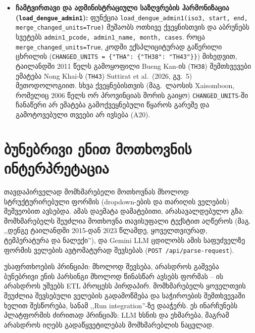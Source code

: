 \documentclass[11pt,a4paper]{article}
\begin{document}
\begin{itemize}[leftmargin=1.4em]
\begin{itemize}
      \item \textbf{შრი-ლანკა (\texttt{LKA}):} 1996--2004, $960$ სტრიქონი, 9 პროვინცია (\texttt{LK1}--\texttt{LK9}, Survey Department of Sri Lanka; 9-ვე ზუსტი ავტომატური დამთხვევაა; Eastern \texttt{LK5}-ს 2000 წელს მონაცემი არ აქვს).
      \item \textbf{სალვადორი (\texttt{SLV}):} 2000--2009, $1\,587$ სტრიქონი, 14 დეპარტამენტი (\texttt{SV01}--\texttt{SV14}, წყარო \texttt{www.gadm.org}; 8 ზუსტი და 6 ესპანური დიაკრიტიკული დამთხვევა HDX-ის \texttt{adm1\_ref\_name}-ით; San Salvador \texttt{SV10} იწყება 2003-01-დან).
    \end{itemize}
  \item \textbf{ჩამტვირთავი და ადმინისტრაციული საზღვრების ჰარმონიზაცია (\texttt{load\_dengue\_admin1}):}
    ფუნქცია \texttt{load\_dengue\_admin1(iso3, start, end, merge\_changed\_units=True)} მუშაობს ოთხივე
    ქვეყნისთვის და აბრუნებს სვეტებს \texttt{admin1\_pcode, admin1\_name, month, cases}. როცა
    \texttt{merge\_changed\_units=True}, კოდში ექსპლიციტურად გაწერილი ცხრილის
    (\texttt{CHANGED\_UNITS = \{"THA": \{"TH38": "TH43"\}\}}) მიხედვით, ტაილანდში 2011 წელს გამოყოფილი
    Bueng Kan-ის (\texttt{TH38}) შემთხვევები ემატება Nong Khai-ს (\texttt{TH43}) Suttirat et al.\ (2026, გვ.~5)
    მეთოდოლოგიით. სხვა ქვეყნებისთვის (მაგ.\ ლაოსის Xaisomboon, რომელიც 2006 წელს ორ პროვინციას შორის გაიყო)
    \texttt{CHANGED\_UNITS}-ში ჩანაწერი არ ემატება გამოქვეყნებული წყაროს გარეშე და გამოტოვებული თვეები არ ივსება (A20).
\end{itemize}

\section{ბუნებრივი ენით მოთხოვნის ინტერპრეტაცია}
\label{sec:nl-parsing}

თავდაპირველად მომხმარებელი მოთხოვნას მხოლოდ სტრუქტურირებული ფორმის
(dropdown-ების და თარიღის ველების) მეშვეობით ავსებდა. ამას დაემატა
დამატებითი, არასავალდებულო გზა: მომხმარებელს შეუძლია მოთხოვნა
თავისუფალი ტექსტით აღწეროს (მაგ. ,,დენგე ტაილანდში 2015-დან 2023
წლამდე, ყოველთვიურად, ტემპერატურა და ნალექი''), და Gemini LLM ცდილობს
ამის საფუძველზე ფორმის ველების ავტომატურად შევსებას
(\texttt{POST /api/parse-request}).

\begin{infobox}{უსაფრთხოების პრინციპი: მხოლოდ შევსება, არასდროს გაშვება}
ბუნებრივი ენის პარსინგი მხოლოდ წინასწარ ავსებს ფორმას -- ის არასდროს
უშვებს ETL პროცესს პირდაპირ. მომხმარებელს ყოველთვის შეუძლია შევსებული
ველების გადამოწმება და საჭიროების შემთხვევაში ხელით შესწორება, სანამ
,,Run integration''-ზე დააჭერს. ეს ინარჩუნებს პლატფორმის ძირითად
პრინციპს: LLM ხსნის და ეხმარება, მაგრამ არასდროს იღებს გადაწყვეტილებას
მომხმარებლის ნაცვლად.
\end{infobox}
\end{document}
